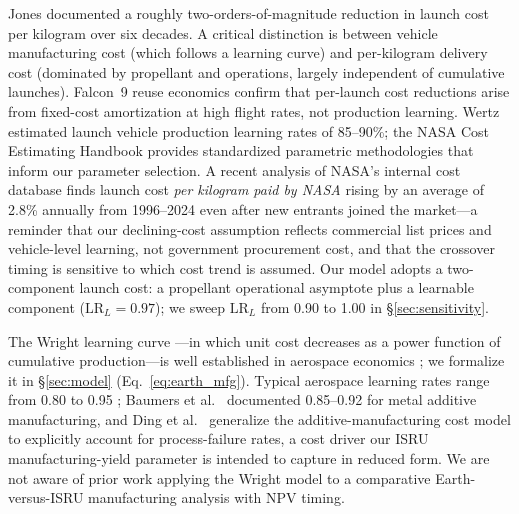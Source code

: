 Jones \cite{jones2018,jones2020,jones2022} documented a roughly two-orders-of-magnitude reduction in launch cost per kilogram over six decades. A critical distinction is between vehicle manufacturing cost (which follows a learning curve) and per-kilogram delivery cost (dominated by propellant and operations, largely independent of cumulative launches). Falcon~9 reuse economics \cite{zapata2019} confirm that per-launch cost reductions arise from fixed-cost amortization at high flight rates, not production learning. Wertz \cite{wertz2011} estimated launch vehicle production learning rates of 85--90\%; the NASA Cost Estimating Handbook \cite{nasa2015handbook} provides standardized parametric methodologies that inform our parameter selection. A recent analysis of NASA's internal cost database \cite{kim2025} finds launch cost \emph{per kilogram paid by NASA} rising by an average of 2.8\% annually from 1996--2024 even after new entrants joined the market---a reminder that our declining-cost assumption reflects commercial list prices and vehicle-level learning, not government procurement cost, and that the crossover timing is sensitive to which cost trend is assumed. Our model adopts a two-component launch cost: a propellant operational asymptote plus a learnable component ($\mathrm{LR}_L = 0.97$); we sweep $\mathrm{LR}_L$ from 0.90 to 1.00 in \S\ref{sec:sensitivity}.

The Wright learning curve \cite{wright1936}---in which unit cost decreases as a power function of cumulative production---is well established in aerospace economics \cite{dutton1984,argote1990,nagy2013}; we formalize it in \S\ref{sec:model} (Eq.~\ref{eq:earth_mfg}). Typical aerospace learning rates range from 0.80 to 0.95 \cite{wertz2011}; Baumers et al.\ \cite{baumers2016} documented 0.85--0.92 for metal additive manufacturing, and Ding et al.\ \cite{ding2021} generalize the additive-manufacturing cost model to explicitly account for process-failure rates, a cost driver our ISRU manufacturing-yield parameter is intended to capture in reduced form. We are not aware of prior work applying the Wright model to a comparative Earth-versus-ISRU manufacturing analysis with NPV timing.

